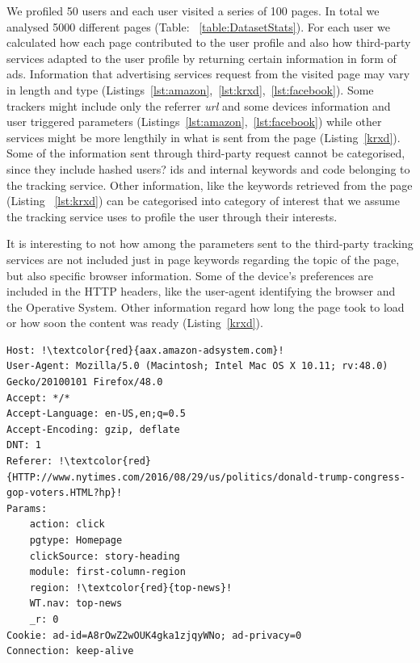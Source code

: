 We profiled 50 users and each user visited a series of 100 pages. In total we analysed 5000 different pages (Table: ~\ref{table:DatasetStats}). For each user we calculated how each page contributed to the user profile and also how third-party services adapted to the user profile by returning certain information in form of ads. Information that advertising services request from the visited page may vary in length and type (Listings~\ref{lst:amazon},~\ref{lst:krxd},~\ref{lst:facebook}). Some trackers might include only the referrer \emph{url} and some devices information and user triggered parameters (Listings~\ref{lst:amazon},~\ref{lst:facebook}) while other services might be more lengthily in what is sent from the page (Listing~\ref{krxd}). Some of the information sent through third-party request cannot be categorised, since they include hashed users? ids and internal keywords and code belonging to the tracking service. Other information, like the keywords retrieved from the page (Listing ~\ref{lst:krxd}) can be categorised into category of interest that we assume the tracking service uses to profile the user through their interests.

It is interesting to not how among the parameters sent to the third-party tracking services are not included just in page keywords regarding the topic of the page, but also specific browser information. Some of the device's preferences are included in the HTTP headers, like the user-agent identifying the browser and the Operative System. Other information regard how long the page took to load or how soon the content was ready (Listing~\ref{krxd}).

\begin{lstlisting}[frame=single, breaklines=true, keepspaces=true, basicstyle=\tiny, escapechar=!]
Host: !\textcolor{red}{aax.amazon-adsystem.com}!
User-Agent: Mozilla/5.0 (Macintosh; Intel Mac OS X 10.11; rv:48.0)
Gecko/20100101 Firefox/48.0
Accept: */*
Accept-Language: en-US,en;q=0.5
Accept-Encoding: gzip, deflate
DNT: 1
Referer: !\textcolor{red}{HTTP://www.nytimes.com/2016/08/29/us/politics/donald-trump-congress-gop-voters.HTML?hp}!
Params:
	action: click
	pgtype: Homepage
	clickSource: story-heading
	module: first-column-region
	region: !\textcolor{red}{top-news}!
	WT.nav: top-news
	_r: 0
Cookie: ad-id=A8rOwZ2wOUK4gka1zjqyWNo; ad-privacy=0
Connection: keep-alive
\end{lstlisting}

